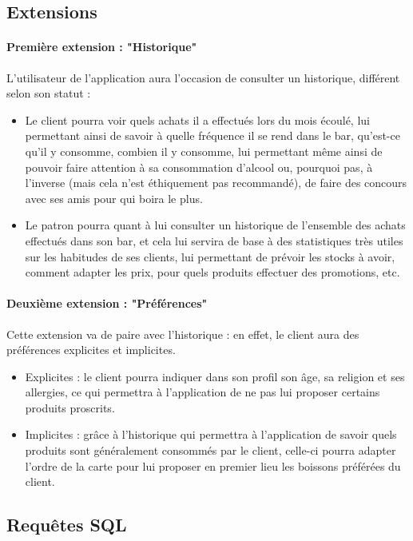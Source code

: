 \documentclass[11pt, a4, oneside, headings=normal]{scrreprt}
\begin{document}
\subsection*{Extensions}

\paragraph{Première extension : "Historique"}
L'utilisateur de l'application aura l'occasion de consulter un historique, différent selon son statut :
\begin{itemize}
\item Le client pourra voir quels achats il a effectués lors du mois écoulé, lui permettant ainsi de savoir à quelle fréquence il se rend dans le bar, qu'est-ce qu'il y consomme, combien il y consomme, lui permettant même ainsi de pouvoir faire attention à sa consommation d'alcool ou, pourquoi pas, à l'inverse (mais cela n'est éthiquement pas recommandé), de faire des concours avec ses amis pour qui boira le plus.

\item Le patron pourra quant à lui consulter un historique de l'ensemble des achats effectués dans son bar, et cela lui servira de base à des statistiques très utiles sur les habitudes de ses clients, lui permettant de prévoir les stocks à avoir, comment adapter les prix, pour quels produits effectuer des promotions, etc.
\end{itemize}

\paragraph{Deuxième extension : "Préférences"}
Cette extension va de paire avec l'historique : en effet, le client aura des préférences explicites et implicites.
\begin{itemize}
\item Explicites : le client pourra indiquer dans son profil son âge, sa religion et ses allergies, ce qui permettra à l'application de ne pas lui proposer certains produits proscrits.
\item Implicites : grâce à l'historique qui permettra à l'application de savoir quels produits sont généralement consommés par le client, celle-ci pourra adapter l'ordre de la carte pour lui proposer en premier lieu les boissons préférées du client.
\end{itemize}

\subsection*{Requêtes SQL}
\end{document}
